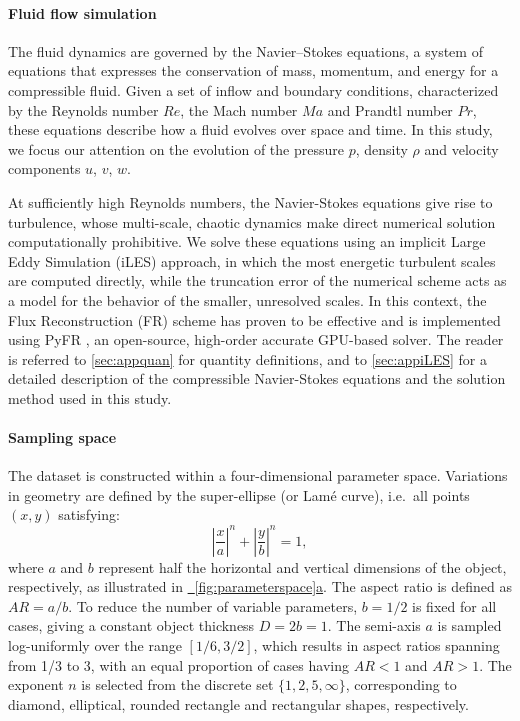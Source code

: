 \documentclass{article}
\newcommand{\subfigref}[2]{\hyperref[#1]{\figureautorefname~\ref*{#1}#2}}
\begin{document}
\paragraph{Fluid flow simulation}
The fluid dynamics are governed by the Navier--Stokes equations, a system of equations that expresses the conservation of mass, momentum, and energy for a compressible fluid. Given a set of inflow and boundary conditions, characterized by the Reynolds number $Re$, the Mach number $Ma$ and Prandtl number $Pr$, these equations describe how a fluid evolves over space and time. In this study, we focus our attention on the evolution of the pressure $p$, density $\rho$ and velocity components $u$, $v$, $w$. 

At sufficiently high Reynolds numbers, the Navier-Stokes equations give rise to turbulence, whose multi-scale, chaotic dynamics make direct numerical solution computationally prohibitive. We solve these equations using an implicit Large Eddy Simulation (iLES) approach, in which the most energetic turbulent scales are computed directly, while the truncation error of the numerical scheme acts as a model for the behavior of the smaller, unresolved scales. In this context, the Flux Reconstruction (FR) scheme \citep{Huynh2007} has proven to be effective and is implemented using PyFR \citep{WITHERDEN20143028}, an open-source, high-order accurate GPU-based solver. The reader is referred to \autoref{sec:appquan} for quantity definitions, and to \autoref{sec:appiLES} for a detailed description of the compressible Navier-Stokes equations and the solution method used in this study. 

\paragraph{Sampling space} \label{sec:appsample}
The dataset is constructed within a four-dimensional parameter space. Variations in geometry are defined by the super-ellipse (or Lamé curve), \textcolor{revcolor}{i.e.}\ all points $(x,y)$ satisfying: 
\begin{equation} \label{eq:lame}
    \left| \frac{x}{a}\right|^n + \left| \frac{y}{b}\right|^n = 1,
\end{equation}
where $a$ and $b$ represent half the horizontal and vertical dimensions of the object, respectively, as illustrated in \subfigref{fig:parameterspace}{a}. The aspect ratio is defined as $AR = a/b$. To reduce the number of variable parameters, $b=1/2$ is fixed for all cases\textcolor{revcolor}{, giving a constant object thickness $D = 2b = 1$.} The semi-axis $a$ is sampled log-uniformly over the range $[1/6, 3/2]$, which results in aspect ratios spanning from 1/3 to 3, with an equal proportion of cases having $AR<1$ and $AR>1$. The exponent $n$ is selected from the discrete set $\{1, 2, 5, \infty\}$, corresponding to diamond, elliptical, rounded rectangle and rectangular shapes, respectively. 
\end{document}

